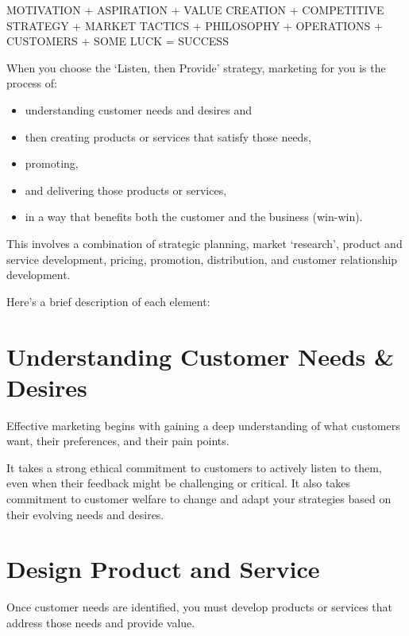 \documentclass[
]{book}
\providecommand{\tightlist}{%
  \setlength{\itemsep}{0pt}\setlength{\parskip}{0pt}}
\begin{document}
{MOTIVATION}
{+}
{ASPIRATION}
{+}
{VALUE CREATION}
{+}
{COMPETITIVE STRATEGY }
{+}
{MARKET TACTICS}
{+}
{PHILOSOPHY}
{+}
{OPERATIONS}
{+}
{CUSTOMERS}
{+}
{SOME LUCK}
{=}
{SUCCESS}

When you choose the {`Listen, then Provide' strategy}, marketing for you is the process of:

\begin{itemize}
\tightlist
\item
  understanding customer needs and desires and
\item
  then creating products or services that satisfy those needs,
\item
  promoting,
\item
  and delivering those products or services,
\item
  in a way that benefits both the customer and the business (win-win).
\end{itemize}

This involves a combination of strategic planning, market `research', product and service development, pricing, promotion, distribution, and customer relationship development.

Here's a brief description of each element:

\hypertarget{understanding-customer-needs-desires}{%
\section{\texorpdfstring{\textbf{Understanding Customer Needs \& Desires}}{Understanding Customer Needs \& Desires}}\label{understanding-customer-needs-desires}}

Effective marketing begins with gaining a deep understanding of what customers want, their preferences, and their pain points.

It takes a strong ethical commitment to customers to actively listen to them, even when their feedback might be challenging or critical. It also takes commitment to customer welfare to change and adapt your strategies based on their evolving needs and desires.

\hypertarget{design-product-and-service}{%
\section{\texorpdfstring{\textbf{Design Product and Service}}{Design Product and Service}}\label{design-product-and-service}}

Once customer needs are identified, you must develop products or services that address those needs and provide value.
\end{document}
